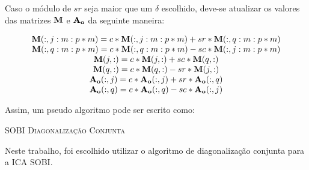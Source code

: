 \documentclass[a4paper,12pt]{monografia}
\theoremstyle{plain}
\theoremstyle{definition}
\theoremstyle{remark}
\begin{document}
Caso o módulo de $sr$ seja maior que um $\delta$ escolhido, deve-se atualizar os valores das matrizes  ${\bf M}$ e ${\bf A_{o}}$ da seguinte maneira:

\begin{equation}
    \begin{array}{c}
    {\bf M}(:,j:m:p*m)=c*{\bf M}(:,j:m:p*m)+sr*{\bf M}(:,q:m:p*m)\\
    {\bf M}(:,q:m:p*m)=c*{\bf M}(:,q:m:p*m)-sc*{\bf M}(:,j:m:p*m)\\
    {\bf M}(j,:)=c*{\bf M}(j,:)+sc*{\bf M}(q,:)\\
    {\bf M}(q,:)=c*{\bf M}(q,:)-sr*{\bf M}(j,:)\\
    {\bf A_{o}}(:,j)=c*{\bf A_{o}}(:,j)+sr*{\bf A_{o}}(:,q)\\
    {\bf A_{o}}(:,q)=c*{\bf A_{o}}(:,q)-sc*{\bf A_{o}}(:,j)
    \end{array}
    \label{eq:sobi5}
\end{equation}

Assim, um pseudo algoritmo pode ser escrito como:

 \begin{algorithm}[h]
   \SetAlgoLined
   \label{alg3}
   \caption{\textsc{SOBI Diagonalização Conjunta}}
 \end{algorithm}
  
 Neste trabalho, foi escolhido utilizar o algoritmo de diagonalização conjunta para a ICA SOBI.
     
\end{document}
